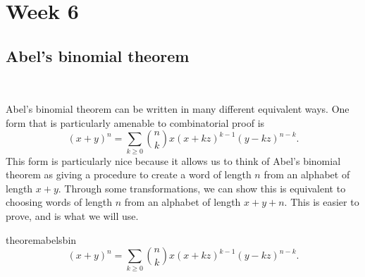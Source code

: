 \section{Week 6}

\subsection*{Abel's binomial theorem}\label{ss: abel6}~

Abel's binomial theorem can be written in many different equivalent ways. One form that is particularly amenable to combinatorial proof is
\[
	(x + y)^{n} = \sum_{k \ge 0} \binom{n}{k} x (x + kz)^{k - 1} (y - kz)^{n - k}.
\]
This form is particularly nice because it allows us to think of Abel's binomial theorem as giving a procedure to create a word of length $n$ from an alphabet of length $x + y$. Through some transformations, we can show this is equivalent to choosing words of length $n$ from an alphabet of length $x + y + n$. This is easier to prove, and is what we will use.

\begin{restatable}{theorem}{abelsbin}
	 \[
		 (x + y)^{n} = \sum_{k \ge 0} \binom{n}{k} x (x + kz)^{k - 1} (y - kz)^{n - k}.
	\]
\end{restatable}

